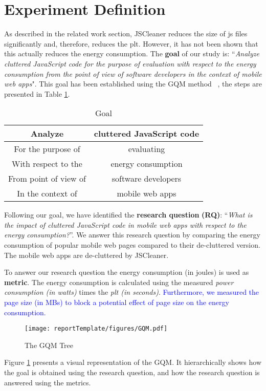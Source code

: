 \section{Experiment Definition}

As described in the related work section, JSCleaner reduces the size of \acrshort{js} files significantly and, therefore, reduces the \acrshort{plt}. However, it has not been shown that this actually reduces the energy consumption. The \textbf{goal} of our study is: ``\textit{Analyze cluttered JavaScript code for the purpose of evaluation with respect to the energy consumption from the point of view of software developers in the context of mobile web apps}". This goal has been established using the GQM method ~\cite{claes2012experimentation}, the steps are presented in Table \ref{tab:goal}.

\begin{table}[H]
    \centering
    \begin{tabular}{||c || c||} 
     \hline
     Analyze & cluttered JavaScript code \\ 
     \hline
     For the purpose of & evaluating \\
     \hline
     With respect to the & energy consumption \\
     \hline
     From point of view of & software developers \\
     \hline
     In the context of & mobile web apps \\
     \hline
    \end{tabular}
    \caption{Goal}\label{tab:goal}
\end{table}

Following our goal, we have identified the \textbf{research question} \textbf{(RQ)}: ``\textit{What is the impact of cluttered JavaScript code in mobile web apps with respect to the energy consumption?}''. We answer this research question by comparing the energy consumption of popular mobile web pages compared to their de-cluttered version. The mobile web apps are de-cluttered by JSCleaner.

To answer our research question the energy consumption (in joules) is used as \textbf{metric}. The energy consumption is calculated using the measured \textit{power consumption (in watts)} times the \textit{\acrshort{plt} (in seconds)}. \textcolor{blue}{Furthermore, we measured the page size (in MBs) to block a potential effect of page size on the energy consumption.} 

\begin{figure}[H]
\texttt{[image: reportTemplate/figures/GQM.pdf]}
\centering
\caption{The GQM Tree} \label{fig:gqm}
\end{figure}

Figure \ref{fig:gqm} presents a visual representation of the GQM. It hierarchically shows how the goal is obtained using the research question, and how the research question is answered using the metrics.
